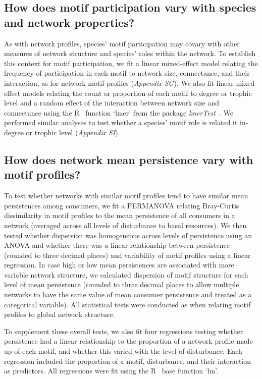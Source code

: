 \documentclass[12pt]{article}
\begin{document}
\begin{spacing}{2.0}
        \subsection*{How does motif participation vary with species and network properties?}

            As with network profiles, species' motif participation may covary with other measures of network structure and species' roles within the network.
            To establish this context for motif participation, we fit a linear mixed-effect model relating the frequency of participation in each motif to network size, connectance, and their interaction, as for network motif profiles (\emph{Appendix SG}).
            We also fit linear mixed-effect models relating the count or proportion of each motif to degree or trophic level and a random effect of the interaction between network size and connectance using the R~\citep{R} function `lmer' from the package \emph{lmerTest}~\citep{lmerTest}.
            We performed similar analyses to test whether a species' motif role is related it in-degree or trophic level (\emph{Appendix SI}).

    		

        \subsection*{How does network mean persistence vary with motif profiles?}

            To test whether networks with similar motif profiles tend to have similar mean persistences among consumers, we fit a PERMANOVA relating Bray-Curtis dissimilarity in motif profiles to the mean persistence of all consumers in a network (averaged across all levels of disturbance to basal resources).
            We then tested whether dispersion was homogeneous across levels of persistence using an ANOVA and whether there was a linear relationship between persistence (rounded to three decimal places) and variability of motif profiles using a linear regression.
            In case high or low mean persistences are associated with more variable network structure, we calculated dispersion of motif structure for each level of mean persistence (rounded to three decimal places to allow multiple networks to have the same value of mean consumer persistence and treated as a categorical variable). 
            All statistical tests were conducted as when relating motif profiles to global network structure.
            
            
            To supplement these overall tests, we also fit four regressions testing whether persistence had a linear relationship to the proportion of a network profile made up of each motif, and whether this varied with the level of disturbance.
            Each regression included the proportion of a motif, disturbance, and their interaction as predictors.
            All regressions were fit using the R~\citep{R} base function `lm'.
        


\end{spacing}
\end{document}
